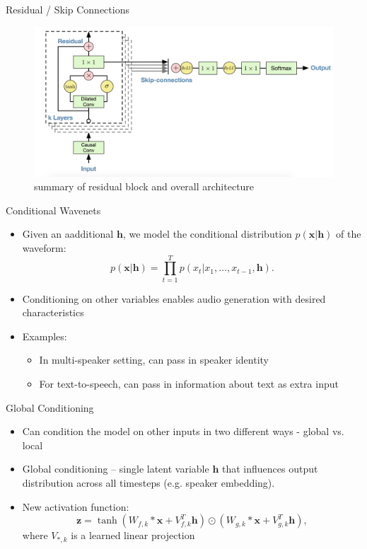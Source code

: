 \documentclass{beamer}
\begin{document}
  \begin{frame}{Residual / Skip Connections}
    \begin{figure}
      \includegraphics[width=1.0\textwidth]{img/residual_layer.png}
      \caption{summary of residual block and overall architecture}
    \end{figure}
  \end{frame}

  \begin{frame}{Conditional Wavenets}
    \begin{itemize}
      \item Given an aadditional $\mathbf{h}$, we model the conditional distribution $p(\mathbf{x} | \mathbf{h})$ of the waveform:
        \[
          p(\mathbf{x} | \mathbf{h}) = \prod_{t=1}^T p(x_t | x_1, \dots, x_{t-1}, \mathbf{h}).
        \]
     \item Conditioning on other variables enables audio generation with desired characteristics
     \item Examples: 
      \begin{itemize} 
       \item In multi-speaker setting, can pass in speaker identity
       \item For text-to-speech, can pass in information about text as extra input
      \end{itemize}
    \end{itemize}
  \end{frame}


  \begin{frame}{Global Conditioning}
    \begin{itemize}
      \item Can condition the model on other inputs in two different ways - global vs. local
      \item Global conditioning -- single latent variable $\mathbf{h}$ that influences output distribution across all timesteps (e.g. speaker embedding).    
      \item New activation function:
        \[
          \mathbf{z} = \tanh(W_{f, k} * \mathbf{x} + V_{f, k}^T \mathbf{h}) \odot (W_{g, k} * \mathbf{x} + V_{g, k}^T \mathbf{h}),
        \]
        where $V_{*, k}$ is a learned linear projection
    \end{itemize}
  \end{frame}
\end{document}
